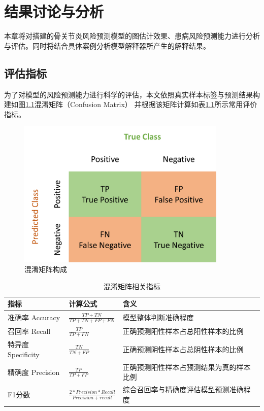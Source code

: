\chapter{结果讨论与分析}
本章将对搭建的骨关节炎风险预测模型的图估计效果、患病风险预测能力进行分析与评估。同时将结合具体案例分析模型解释器所产生的解释结果。
\section{评估指标}
为了对模型的风险预测能力进行科学的评估，本文依照真实样本标签与预测结果构建如图\ref{fig:ConfusionMatrix}混淆矩阵（Confusion Matrix）
并根据该矩阵计算如表\ref{tab:ConfusionMatrixFactor}所示常用评价指标\cite{gaudillo_machine_2019}。

\begin{figure}[!ht]
	\centering
	\includegraphics[width=10cm]{./figures/Chapter4/GNN/ConfusionMatrix.png}
	\caption{混淆矩阵构成} \label{fig:ConfusionMatrix}
\end{figure}

\begin{table}[!h]
	\renewcommand{\arraystretch}{1.2}
	\centering\wuhao
	\caption{混淆矩阵相关指标} \label{tab:ConfusionMatrixFactor} \vspace{2mm}
	\begin{tabularx}{\textwidth} { 
   >{\centering\arraybackslash}X 
   >{\centering\arraybackslash}X
   >{\centering\arraybackslash}X}
	\toprule[1.5pt]
		指标 & 计算公式 & 含义 \\
	\midrule[1pt]
		准确率 Accuracy & $\frac{TP+TN}{TP+TN+FP+FN}$ & 模型整体判断准确程度 \\
        召回率 Recall & $\frac{TP}{TP+FN}$ &
        正确预测阳性样本占总阳性样本的比例 \\
        特异度 Specificity & $\frac{TN}{TN+FP}$ &
        正确预测阴性样本占总阴性样本的比例 \\
        精确度 Precision & $\frac{TP}{TP+FP}$ &
        正确预测阳性样本占预测结果为真的样本比例 \\
        F1分数 & $\frac{2*Precision*Recall}{Precision+recall}$ &
        综合召回率与精确度评估模型预测准确程度 \\
	\bottomrule[1.5pt]
	\end{tabularx}
\end{table}

